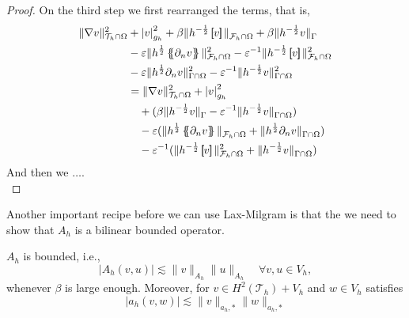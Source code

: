 \begin{proof}
 On the third step we first rearranged the terms, that is,
 \[
     \begin{split}
   \| \nabla v \|_{ \mathcal{T}_{h} \cap  \Omega }^{ 2 } & + \left\lvert v \right\rvert_{ g_{h} }^{ 2 } + \beta \| h^{-\frac{1}{2}} \jump{ v }   \|_{\mathcal{F} _{h} \cap \Omega   }^{  }   + \beta \| h^{-\frac{1}{2}}  v    \|_{ \Gamma}^{  }
\\  &- \varepsilon \| h^{\frac{1}{2}}  \mean{  \partial _{n} v}      \|_{ \mathcal{F} _{h} \cap \Omega  }^{2  } - \varepsilon ^{-1} \| h^{-\frac{1}{2}} \jump{ v }   \|_{\mathcal{F} _{h} \cap \Omega   }^{ 2 }
\\ &-  \varepsilon \| h^{\frac{1}{2}} \partial _{n} v \|_{ \Gamma \cap \Omega  }^{2  } -  \varepsilon ^{-1} \| h^{-\frac{1}{2}} v \|_{  \Gamma \cap  \Omega }^{ 2 } \\
&=  \| \nabla v \|_{ \mathcal{T}_{h} \cap  \Omega }^{ 2 }  + \left\lvert v \right\rvert_{ g_{h} }^{ 2 } \\
&\quad  + ( \beta \| h^{-\frac{1}{2}} v \|_{\Gamma   }^{  } - \varepsilon ^{ -1}\| h^{-\frac{1}{2}} v \|_{\Gamma \cap \Omega    }^{  } )  \\
&\quad  -  \varepsilon ( \| h^{\frac{1}{2}} \mean{ \partial _{n} v }    \|_{  \mathcal{F}_{h} \cap \Omega  }^{  } + \| h^{\frac{1}{2}} \partial _{n} v \|_{ \Gamma \cap \Omega  }^{  }  ) \\
&\quad  - \varepsilon ^{-1} ( \| h^{-\frac{1}{2}} \jump{ v }   \|_{ \mathcal{F}_{h} \cap \Omega   }^{2  } + \| h^{-\frac{1}{2}} v \|_{ \Gamma \cap \Omega   }^{  }  )
     \end{split}
 \]
 And then we $\ldots$.
 \\

\end{proof}

Another important recipe before we can use Lax-Milgram is that the we need to show that $A_{h} $ is a bilinear bounded operator.

\begin{lemma}
    $A_{h}$ is bounded, i.e.,
    $$ \left\lvert A_{h}( v,u) \right\rvert \lesssim \| v \|_{A_{h}  }^{  }     \| u \|_{A_{h}  }^{  } \quad  \forall v,u \in V _{h}, $$
    whenever $\beta $ is large enough. Moreover, for $v \in  H^{2}( \mathcal{T}_{h} ) + V_{h} $
    and $w \in V_{h}$ satisfies \[
    \left\lvert a_{h}( v,w) \right\rvert  \lesssim \| v \|_{ a_{h},* }^{  }  \| w \|_{ a_{h},* }^{  }
    \]
\end{lemma}

